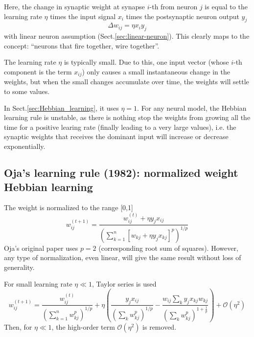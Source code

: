 Here, the change in synaptic weight at synapse $i$-th from neuron $j$ is equal
to the learning rate $\eta$ times the input signal $x_i$ times the postsynaptic
neuron output $y_j$ 
\begin{equation}
\label{eq:generalized-Hebbian-learning}
\Delta w_{ij} = \eta x_i y_j 
\end{equation}
with linear neuron assumption (Sect.\ref{sec:linear-neuron}).
This clearly maps to the concept: ``neurons that fire together, wire together''.

The learning rate $\eta$ is typically small.
Due to this, one input vector (whose $i$-th component is the term $x_{ij}$) only
causes a small instantaneous change in the weights, but when the small changes
accumulate over time, the weights will settle to some values.

In Sect.\ref{sec:Hebbian_learning}, it uses $\eta=1$.%
For any neural model, the Hebbian learning rule is unstable, as there is nothing
stop the weights from growing all the time for a positive learing rate (finally
leading to a very large values), i.e. the synaptic weights that receives the
dominant input will increase or decrease exponentially.

\subsection{Oja's learning rule (1982): normalized weight Hebbian learning}
\label{sec:Oja-learning-rule}

The weight is normalized to the range [0,1]
\begin{equation}
w_{ij}^{(t+1)} = \frac{w_{ij}^{(t)} + \eta y_j x_{ij}}{\left(
\sum_{k=1}^n[w_{kj} + \eta y_j x_{kj}]^p\right)^{1/p}}
\end{equation}
Oja's original paper uses $p=2$ (corresponding root sum of squares).
However, any type of normalization, even linear, will give the same result
without loss of generality.

For small learning rate $\eta \ll 1$, Taylor series is used
\begin{equation}
w_{ij}^{(t+1)} = \frac{w_{ij}^{(t)}}{\left(\sum_{k=1}^n w_{kj}^p \right)^{1/p}}
+ \eta \left( \frac{y_j x_{ij}}{\left(\sum_{k} w_{kj}^p\right)^{1/p}}
-
\frac{w_{ij}\sum_k y_j x_{kj}w_{kj}}{\left(
\sum_k w_{kj}^p\right)^{1+\frac{1}{p}}}
\right) 
+
\mathcal{O}\left(\eta^2\right)
\end{equation}
Then, for $\eta \ll 1$, the high-order term $\mathcal{O}(\eta^2)$ is removed. 

